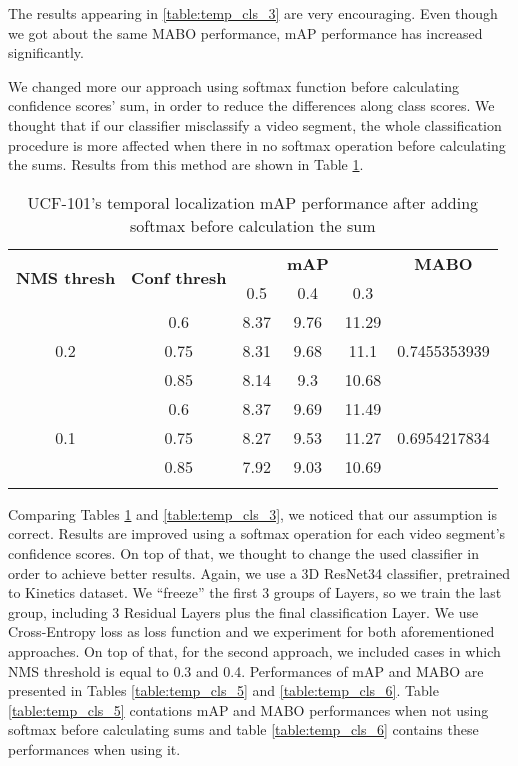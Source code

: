 \begin{center}

The results appearing in \ref{table:temp_cls_3} are very encouraging. Even though we got about the same MABO performance, mAP performance has increased significantly.  \par
We changed more our approach using softmax function before calculating confidence scores' sum, in order to reduce the differences along class scores. We thought that if
our classifier misclassify a video segment, the whole classification procedure is more affected when there in no softmax operation before calculating the sums. Results from this
method are shown in Table \ref{table:temp_cls_4}.


  \setlength{\tabcolsep}{2pt}
  \begin{longtable}{|| c | c || c c c | c ||}

    \hline
    \multirow{2}{*}{\textbf{NMS thresh}} & \multirow{2}{*}{\textbf{Conf thresh}} & {} & \textbf{mAP} & {} & \textbf{MABO} \\
    {} & {} & 0.5 & 0.4 & 0.3 & {}\\
    \hline
    \multirow{3}{*}{0.2} & 0.6 & 8.37 & 9.76 & 11.29  & \multirow{3}{*}{0.7455353939}\\
    \cline{2-5}
    {} & 0.75 &  8.31 & 9.68 & 11.1 & {} \\
    \cline{2-5}
    {} & 0.85 & 8.14 & 9.3 & 10.68  & {}\\
    \hline
    \multirow{3}{*}{0.1} & 0.6 & 8.37 & 9.69 & 11.49  & \multirow{3}{*}{0.6954217834}\\
    \cline{2-5}
    {} & 0.75 & 8.27 & 9.53 & 11.27  & {}\\
    \cline{2-5}
    {} & 0.85 & 7.92 & 9.03 & 10.69 & {}\\
    \hline

    \caption{UCF-101's temporal localization mAP performance after adding softmax before calculation the sum}
    \label{table:temp_cls_4}
  \end{longtable}
\end{center}


Comparing Tables \ref{table:temp_cls_4} and \ref{table:temp_cls_3}, we noticed that our assumption is  correct. Results are improved using a softmax operation for each video segment's confidence
scores. On top of that, we thought to change the used classifier in order to achieve better results.
Again, we use  a 3D ResNet34 classifier, pretrained to Kinetics dataset. We ``freeze'' the first 3 groups of Layers, so we train the last group, including 3 Residual Layers
plus the final classification Layer. We use Cross-Entropy loss as loss function and we experiment for both aforementioned approaches. On top  of that, for the second approach, we included
cases in which NMS threshold is equal to 0.3 and 0.4. Performances of mAP and MABO are
presented in Tables \ref{table:temp_cls_5} and \ref{table:temp_cls_6}. Table \ref{table:temp_cls_5} contations mAP and MABO performances when not using softmax before calculating sums and
table \ref{table:temp_cls_6} contains these performances when using it. 

